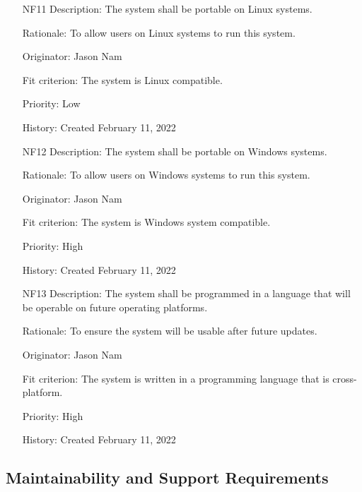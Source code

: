 \documentclass[12pt, titlepage]{article}
\begin{document}
\begin{itemize}
    \item[NF11]
Description: The system shall be portable on Linux systems.

Rationale: To allow users on Linux systems to run this system.

Originator: Jason Nam

Fit criterion: The system is Linux compatible.

Priority: Low

History: Created February 11, 2022

    \item[NF12]
Description: The system shall be portable on Windows systems.

Rationale: To allow users on Windows systems to run this system.

Originator: Jason Nam

Fit criterion: The system is Windows system compatible.

Priority: High

History: Created February 11, 2022

    \item[NF13]
Description: The system shall be programmed in a language that will be operable on future operating platforms.

Rationale: To ensure the system will be usable after future updates.

Originator: Jason Nam

Fit criterion: The system is written in a programming language that is cross-platform.

Priority: High

History: Created February 11, 2022

\end{itemize}

\subsection{Maintainability and Support Requirements}
\end{document}
